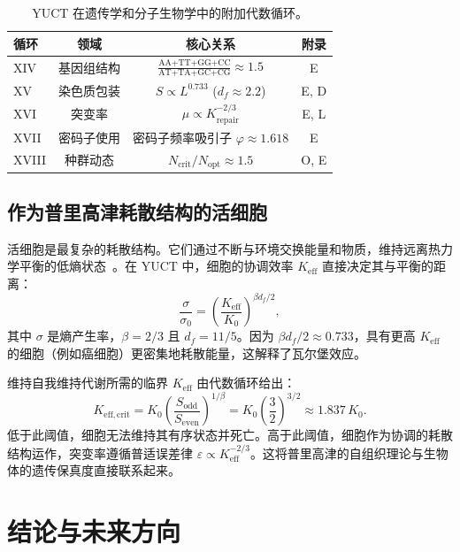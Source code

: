 \documentclass[12pt]{article}
\newcommand{\Keff}{K_{\mathrm{eff}}}
\begin{document}
	\begin{table}[htbp]
		\centering
		\caption{YUCT 在遗传学和分子生物学中的附加代数循环。}
		\label{tab:genetic-loops}
		\footnotesize
		\begin{tabular}{l c c c}
			\toprule
			\textbf{循环} & \textbf{领域} & \textbf{核心关系} & \textbf{附录} \\
			\midrule
			XIV & 基因组结构 & \(\frac{\text{AA+TT+GG+CC}}{\text{AT+TA+GC+CG}} \approx 1.5\) & E \\
			XV & 染色质包装 & \(S \propto L^{0.733}\) (\(d_f \approx 2.2\)) & E, D \\
			XVI & 突变率 & \(\mu \propto K_{\mathrm{repair}}^{-2/3}\) & E, L \\
			XVII & 密码子使用 & 密码子频率吸引子 \(\varphi \approx 1.618\) & E \\
			XVIII & 种群动态 & \(N_{\mathrm{crit}}/N_{\mathrm{opt}} \approx 1.5\) & O, E \\
			\bottomrule
		\end{tabular}
	\end{table}
	
	\subsection{作为普里高津耗散结构的活细胞}
	\label{subsec:prigogine}
	
	活细胞是最复杂的耗散结构。它们通过不断与环境交换能量和物质，维持远离热力学平衡的低熵状态~\cite{Prigogine1977}。在 YUCT 中，细胞的协调效率 $\Keff$ 直接决定其与平衡的距离：
	\begin{equation}
		\frac{\sigma}{\sigma_0} = \left( \frac{\Keff}{K_0} \right)^{\beta d_f / 2},
	\end{equation}
	其中 $\sigma$ 是熵产生率，$\beta=2/3$ 且 $d_f=11/5$。因为 $\beta d_f / 2 \approx 0.733$，具有更高 $\Keff$ 的细胞（例如癌细胞）更密集地耗散能量，这解释了瓦尔堡效应。
	
	维持自我维持代谢所需的临界 $\Keff$ 由代数循环给出：
	\begin{equation}
		K_{\mathrm{eff},\mathrm{crit}} = K_0 \left( \frac{S_{\mathrm{odd}}}{S_{\mathrm{even}}} \right)^{1/\beta}
		= K_0 \left( \frac{3}{2} \right)^{3/2} \approx 1.837\,K_0 .
	\end{equation}
	低于此阈值，细胞无法维持其有序状态并死亡。高于此阈值，细胞作为协调的耗散结构运作，突变率遵循普适误差律 $\varepsilon \propto \Keff^{-2/3}$。这将普里高津的自组织理论与生物体的遗传保真度直接联系起来。
	
	\section{结论与未来方向}
	
\end{document}
